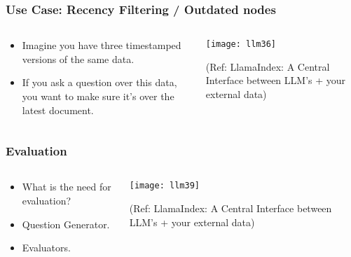 \begin{frame}[fragile]\frametitle{Use Case: Recency Filtering / Outdated nodes}

\begin{columns}
    \begin{column}[T]{0.4\linewidth}
		\begin{itemize}
		\item Imagine you have three timestamped versions of the same data.
		\item If you ask a question over this data, you want to make sure it’s over the latest document.
		\end{itemize}	
    \end{column}
    \begin{column}[T]{0.6\linewidth}
		\begin{center}
		\texttt{[image: llm36]}

		{\tiny (Ref: LlamaIndex: A Central Interface between LLM’s + your external data)}
		\end{center}
    \end{column}
  \end{columns}
\end{frame}

\begin{frame}[fragile]\frametitle{Evaluation}

\begin{columns}
    \begin{column}[T]{0.4\linewidth}
		\begin{itemize}
		\item What is the need for evaluation?
		\item Question Generator.
		\item Evaluators.
		\end{itemize}	
    \end{column}
    \begin{column}[T]{0.6\linewidth}
		\begin{center}
		\texttt{[image: llm39]}

		{\tiny (Ref: LlamaIndex: A Central Interface between LLM’s + your external data)}
		\end{center}
    \end{column}
  \end{columns}
\end{frame}

